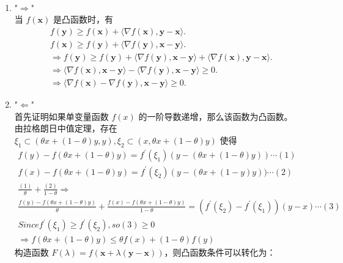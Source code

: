 \documentclass[11pt,letter,notitlepage]{article}
\begin{document}
\begin{solution}
	\heiti
	\ \\
	\begin{enumerate}
		\item "$\Rightarrow$"\\
			当 $f(\mathbf{x})$ 是凸函数时，有 
			\begin{align*}
				f(\mathbf{y}) \geq f(\mathbf{x}) + \langle \nabla f(\mathbf{x}) , \mathbf{y} - \mathbf{x} \rangle.\\
				f(\mathbf{x}) \geq f(\mathbf{y}) + \langle \nabla f(\mathbf{y}) , \mathbf{x} - \mathbf{y} \rangle.\\
				\Rightarrow f(\mathbf{y}) \geq f(\mathbf{y}) + \langle \nabla f(\mathbf{y}) , \mathbf{x} - \mathbf{y} \rangle + \langle \nabla f(\mathbf{x}) , \mathbf{y} - \mathbf{x} \rangle.\\
				\Rightarrow \langle \nabla f(\mathbf{x}) , \mathbf{x} - \mathbf{y} \rangle - \langle \nabla f(\mathbf{y}) , \mathbf{x} - \mathbf{y} \rangle \geq 0.\\
				\Rightarrow \langle \nabla f(\mathbf{x}) - \nabla f(\mathbf{y}) , \mathbf{x} - \mathbf{y} \rangle \geq 0.
			\end{align*}
		\item "$\Leftarrow$"\\
		首先证明如果单变量函数 $f(x)$ 的一阶导数递增，那么该函数为凸函数。\\
		由拉格朗日中值定理，存在$\xi_1 \subset (\theta x+(1-\theta) y, y), \xi_2 \subset (x, \theta x+(1-\theta) y)$ 使得
		$$
		\begin{array}{l}{f(y)-f(\theta x+(1-\theta) y)=f^{\prime}\left(\xi_{1}\right)(y-(\theta x+(1-\theta) y)) \cdots (1)} \\ {f(x)-f(\theta x+(1-\theta) y)=f^{\prime}\left(\xi_{2}\right)\left(y-(\theta x+(1-y) y)) \cdots (2)\right.} \\ {\frac{(1)}{\theta}+\frac{(2)}{1-\theta} \Rightarrow} \\ {\frac{f(y)-f(\theta x+(1-\theta) y)}{\theta}+\frac{f(x)-f(\theta x+(1-\theta) y)}{1-\theta}=\left(f^{\prime}\left(\xi_{2}\right)-f^{\prime}\left(\xi_{1}\right)\right)(y - x) \cdots (3)} \\Since {f^{\prime}\left(\xi_{1}\right) \geqslant f^{\prime}\left(\xi_{2}\right)}, so (3) \geq 0 \\ {\Rightarrow f(\theta x+(1-\theta) y) \leqslant \theta f(x)+(1-\theta) f(y)}\end{array}
		$$
		构造函数 $  F(\lambda) = f(\mathbf{x} + \lambda(\mathbf{y}-\mathbf{x}))$，则凸函数条件可以转化为：

\end{enumerate}
\end{solution}
\end{document}
